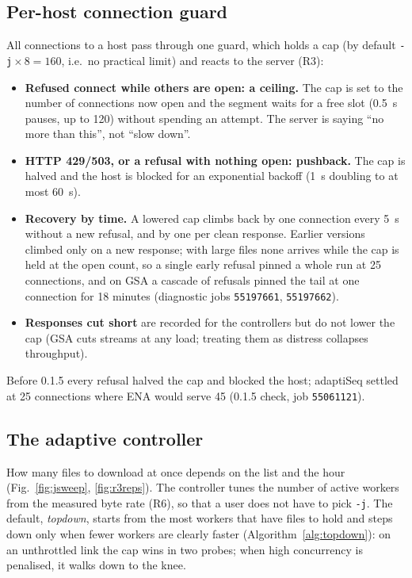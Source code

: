 \documentclass[11pt,a4paper]{article}
\newcommand{\code}[1]{\texttt{#1}}
\newcommand{\figref}[1]{Fig.~\ref{#1}}
\begin{document}
\subsection{Per-host connection guard}
\label{sec:guard}
All connections to a host pass through one guard, which holds a cap (by default \code{-j}${}\times 8 = 160$, i.e.\ no
practical limit) and reacts to the server (R3):
\begin{itemize}
\item \textbf{Refused connect while others are open: a ceiling.} The cap is set to the number of connections now
open and the segment waits for a free slot (0.5~s pauses, up to 120) without spending an attempt. The server is
saying ``no more than this'', not ``slow down''.
\item \textbf{HTTP 429/503, or a refusal with nothing open: pushback.} The cap is halved and the host is blocked for
an exponential backoff (1~s doubling to at most 60~s).
\item \textbf{Recovery by time.} A lowered cap climbs back by one connection every 5~s without a new refusal, and by
one per clean response. Earlier versions climbed only on a new response; with large files none arrives while the cap
is held at the open count, so a single early refusal pinned a whole run at 25 connections, and on GSA a cascade of
refusals pinned the tail at one connection for 18 minutes (diagnostic jobs \code{55197661}, \code{55197662}).
\item \textbf{Responses cut short} are recorded for the controllers but do not lower the cap (GSA cuts streams at any
load; treating them as distress collapses throughput).
\end{itemize}
Before 0.1.5 every refusal halved the cap and blocked the host; adaptiSeq settled at 25 connections where ENA would
serve 45 (0.1.5 check, job \code{55061121}).

\subsection{The adaptive controller}
\label{sec:ctrl}
How many files to download at once depends on the list and the hour (\figref{fig:jsweep}, \ref{fig:r3reps}). The
controller tunes the number of active workers from the measured byte rate (R6), so that a user does not have to pick
\code{-j}. The default, \emph{topdown}, starts from the most workers that have files to hold and steps down only when fewer
workers are clearly faster (Algorithm~\ref{alg:topdown}): on an unthrottled link the cap wins in two probes; when high
concurrency is penalised, it walks down to the knee.
\end{document}
